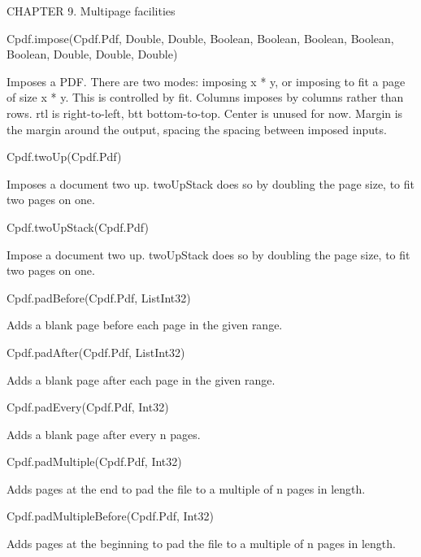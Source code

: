 CHAPTER 9. Multipage facilities

Cpdf.impose(Cpdf.Pdf, Double, Double, Boolean, Boolean, Boolean, Boolean,
Boolean, Double, Double, Double)

Imposes a PDF. There are two modes: imposing x * y, or imposing to fit a page
of size x * y. This is controlled by fit. Columns imposes by columns rather
than rows. rtl is right-to-left, btt bottom-to-top. Center is unused for now.
Margin is the margin around the output, spacing the spacing between imposed
inputs.

Cpdf.twoUp(Cpdf.Pdf)

Imposes a document two up. twoUpStack does so by doubling the page size, to fit
two pages on one.

Cpdf.twoUpStack(Cpdf.Pdf)

Impose a document two up. twoUpStack does so by doubling the page size, to fit
two pages on one.

Cpdf.padBefore(Cpdf.Pdf, List{Int32})

Adds a blank page before each page in the given range.

Cpdf.padAfter(Cpdf.Pdf, List{Int32})

Adds a blank page after each page in the given range.

Cpdf.padEvery(Cpdf.Pdf, Int32)

Adds a blank page after every n pages.

Cpdf.padMultiple(Cpdf.Pdf, Int32)

Adds pages at the end to pad the file to a multiple of n pages in length.

Cpdf.padMultipleBefore(Cpdf.Pdf, Int32)

Adds pages at the beginning to pad the file to a multiple of n pages in length.

